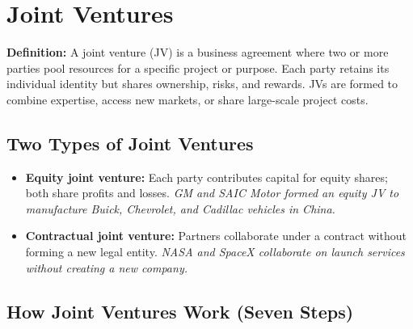 \documentclass[11pt, letterpaper]{article}
\begin{document}
\newpage

\section{Joint Ventures}

\begin{defbox}
\textbf{Definition:} A joint venture (JV) is a business agreement where two or more parties pool resources for a specific project or purpose. Each party retains its individual identity but shares ownership, risks, and rewards. JVs are formed to combine expertise, access new markets, or share large-scale project costs.
\end{defbox}

\subsection{Two Types of Joint Ventures}

\begin{itemize}[leftmargin=*]
  \item \textbf{Equity joint venture:} Each party contributes capital for equity shares; both share profits and losses. \textit{GM and SAIC Motor formed an equity JV to manufacture Buick, Chevrolet, and Cadillac vehicles in China.}
  \item \textbf{Contractual joint venture:} Partners collaborate under a contract without forming a new legal entity. \textit{NASA and SpaceX collaborate on launch services without creating a new company.}
\end{itemize}

\subsection{How Joint Ventures Work (Seven Steps)}
\end{document}
